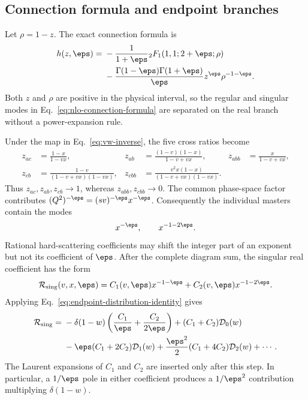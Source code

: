 \subsection{Connection formula and endpoint branches}

Let $\rho=1-z$.  The exact connection formula is
\begin{align}
 h(z,\eps)={}&-\frac{1}{1+\eps}
 {}_2F_1(1,1;2+\eps;\rho)
 \notag\\
 &-\frac{\Gamma(1-\eps)\Gamma(1+\eps)}{\eps}
 z^\eps\rho^{-1-\eps}.
 \label{eq:nlo-connection-formula}
\end{align}
Both $z$ and $\rho$ are positive in the physical interval, so the regular
and singular modes in Eq.~\eqref{eq:nlo-connection-formula} are separated on
the real branch without a power-expansion rule.

Under the map in Eq.~\eqref{eq:vw-inverse}, the five cross ratios become
\begin{equation}
\begin{aligned}
 z_{ac}&=\frac{1-x}{1-vx},
 &z_{ab}&=\frac{(1-v)(1-x)}{1-v+vx},
 &z_{abb}&=\frac{x}{1-v+vx},\\
 z_{cb}&=\frac{1-v}{(1-v+vx)(1-vx)},
 &z_{cbb}&=\frac{v^2x(1-x)}{(1-v+vx)(1-vx)}.
\end{aligned}
\label{eq:nlo-cross-ratios-endpoint}
\end{equation}
Thus $z_{ac},z_{ab},z_{cb}\to1$, whereas
$z_{abb},z_{cbb}\to0$.  The common phase-space factor contributes
$(Q^2)^{-\eps}=(sv)^{-\eps}x^{-\eps}$.  Consequently the individual
masters contain the modes
\begin{equation}
 x^{-\eps},
 \qquad x^{-1-2\eps}.
 \label{eq:nlo-individual-master-modes}
\end{equation}
Rational hard-scattering coefficients may shift the integer part of an
exponent but not its coefficient of $\eps$.  After the complete diagram sum,
the singular real coefficient has the form
\begin{equation}
 \mathcal R_{\rm sing}(v,x,\eps)
 =C_1(v,\eps)x^{-1-\eps}
 +C_2(v,\eps)x^{-1-2\eps}.
 \label{eq:nlo-two-endpoint-branches}
\end{equation}
Applying Eq.~\eqref{eq:endpoint-distribution-identity} gives
\begin{align}
 \mathcal R_{\rm sing}={}&
 -\delta(1-w)\left(\frac{C_1}{\eps}+\frac{C_2}{2\eps}\right)
 +(C_1+C_2)\mathcal D_0(w)
 \notag\\
 &-\eps(C_1+2C_2)\mathcal D_1(w)
 +\frac{\eps^2}{2}(C_1+4C_2)\mathcal D_2(w)+\cdots .
 \label{eq:nlo-two-branch-distribution}
\end{align}
The Laurent expansions of $C_1$ and $C_2$ are inserted only after this
step.  In particular, a $1/\eps$ pole in either coefficient produces a
$1/\eps^2$ contribution multiplying $\delta(1-w)$.

